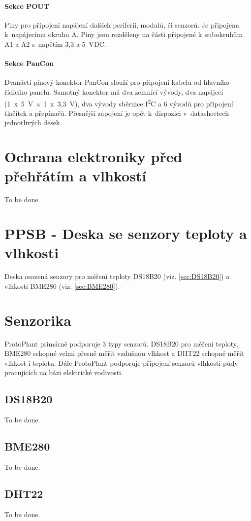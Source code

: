 \paragraph{Sekce POUT} 
Piny pro připojení napájení dalších periferií, modulů, či senzorů.
Je připojena k~napájecímu okruhu A.
Piny jsou rozděleny na části připojené k~subokruhům A1 a A2 s~napětím 3,3 a 5~VDC.

\paragraph{Sekce PanCon}
Dvanácti-pinový konektor PanCon slouží pro připojení kabelu od hlavního řídícího panelu. 
Samotný konektor má dva zemnící vývody, dva napájecí (1~x~5~V~a~1~x~3,3~V), dva vývody sběrnice I\textsuperscript{2}C a 6 vývodů pro připojení tlačítek a přepínačů.
Přesnější zapojení je opět k~dispozici v~datasheetech jednotlivých desek.

\section{Ochrana elektroniky před přehřátím a vlhkostí}
To be done.

\section{PPSB - Deska se senzory teploty a vlhkosti}
Deska osazená senzory pro měření teploty DS18B20 (viz. \autoref{sec:DS18B20}) a vlhkosti BME280 (viz. \autoref{sec:BME280}). 

\section{Senzorika}
ProtoPlant primárně podporuje 3 typy senzorů. 
DS18B20 pro měření teploty, BME280 schopné velmi přesně měřit vzdušnou vlhkost a DHT22 schopné měřit vlhkost i teplotu.
Dále ProtoPlant podporuje připojení senzorů vlhkosti půdy pracujících na bázi elektrické vodivosti.

\subsection{DS18B20}
\label{sec:DS18B20}
To be done.

\subsection{BME280}
\label{sec:BME280}
To be done.

\subsection{DHT22}
\label{sec:DHT22}
To be done.

\newpage